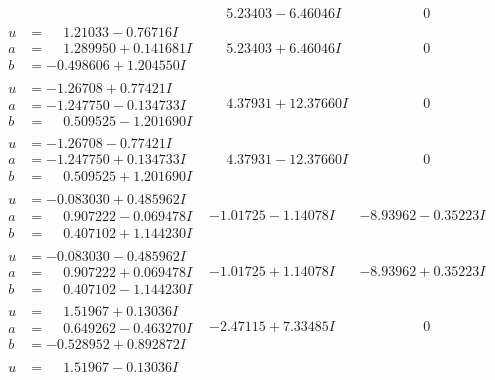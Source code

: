 \documentclass[1p]{elsarticle_modified}
\theoremstyle{definition}
\begin{document}
$$\begin{array}{c|c|c}
 & \phantom{-}5.23403 - 6.46046 I & \phantom{-0.000000 } 0 \\ \hline\begin{aligned}
u &= \phantom{-}1.21033 - 0.76716 I \\
a &= \phantom{-}1.289950 + 0.141681 I \\
b &= -0.498606 + 1.204550 I\end{aligned}
 & \phantom{-}5.23403 + 6.46046 I & \phantom{-0.000000 } 0 \\ \hline\begin{aligned}
u &= -1.26708 + 0.77421 I \\
a &= -1.247750 - 0.134733 I \\
b &= \phantom{-}0.509525 - 1.201690 I\end{aligned}
 & \phantom{-}4.37931 + 12.37660 I & \phantom{-0.000000 } 0 \\ \hline\begin{aligned}
u &= -1.26708 - 0.77421 I \\
a &= -1.247750 + 0.134733 I \\
b &= \phantom{-}0.509525 + 1.201690 I\end{aligned}
 & \phantom{-}4.37931 - 12.37660 I & \phantom{-0.000000 } 0 \\ \hline\begin{aligned}
u &= -0.083030 + 0.485962 I \\
a &= \phantom{-}0.907222 - 0.069478 I \\
b &= \phantom{-}0.407102 + 1.144230 I\end{aligned}
 & -1.01725 - 1.14078 I & -8.93962 - 0.35223 I \\ \hline\begin{aligned}
u &= -0.083030 - 0.485962 I \\
a &= \phantom{-}0.907222 + 0.069478 I \\
b &= \phantom{-}0.407102 - 1.144230 I\end{aligned}
 & -1.01725 + 1.14078 I & -8.93962 + 0.35223 I \\ \hline\begin{aligned}
u &= \phantom{-}1.51967 + 0.13036 I \\
a &= \phantom{-}0.649262 - 0.463270 I \\
b &= -0.528952 + 0.892872 I\end{aligned}
 & -2.47115 + 7.33485 I & \phantom{-0.000000 } 0 \\ \hline\begin{aligned}
u &= \phantom{-}1.51967 - 0.13036 I \\

\end{aligned}
\end{array}$$
\end{document}
